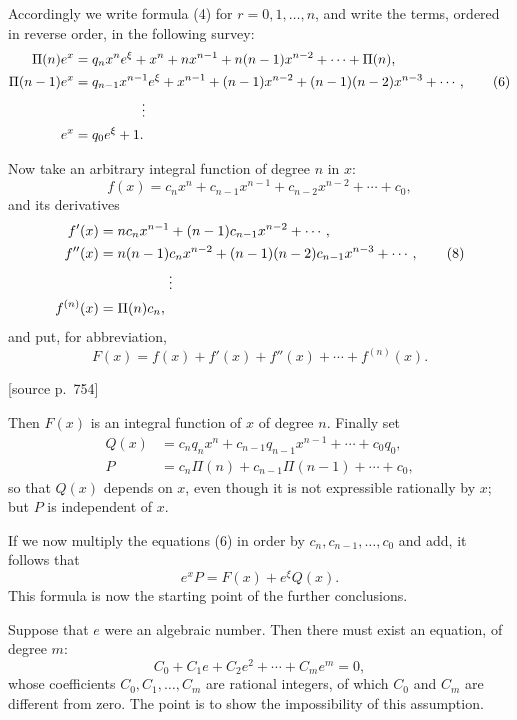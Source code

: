 \documentclass[11pt]{article}
\newcommand{\srcpage}[1]{\par\medskip\noindent\textsf{[source p.~#1]}\par\smallskip}
\begin{document}
Accordingly we write formula (4) for $r=0,1,\ldots,n$, and write the terms, ordered in reverse order, in the following survey:
\begin{align}
\Pi(n)e^x&=q_nx^n e^\xi+x^n+nx^{n-1}+n(n-1)x^{n-2}+\cdots+\Pi(n),\notag\\
\Pi(n-1)e^x&=q_{n-1}x^{n-1}e^\xi+x^{n-1}+(n-1)x^{n-2}
 +(n-1)(n-2)x^{n-3}+\cdots,\tag{6}\\
&\hspace{5em}\vdots\notag\\
e^x&=q_0e^\xi+1.\notag
\end{align}

Now take an arbitrary integral function of degree $n$ in $x$:
\begin{equation}\tag{7}
f(x)=c_nx^n+c_{n-1}x^{n-1}+c_{n-2}x^{n-2}+\cdots+c_0,
\end{equation}
and its derivatives
\begin{align}
f'(x)&=nc_nx^{n-1}+(n-1)c_{n-1}x^{n-2}+\cdots,\\
f''(x)&=n(n-1)c_nx^{n-2}+(n-1)(n-2)c_{n-1}x^{n-3}+\cdots,\tag{8}\\
&\hspace{5em}\vdots\notag\\
f^{(n)}(x)&=\Pi(n)c_n,\notag
\end{align}
and put, for abbreviation,
\begin{equation}\tag{9}
F(x)=f(x)+f'(x)+f''(x)+\cdots+f^{(n)}(x).
\end{equation}

\srcpage{754}
Then $F(x)$ is an integral function of $x$ of degree $n$. Finally set
\begin{align}
Q(x)&=c_nq_nx^n+c_{n-1}q_{n-1}x^{n-1}+\cdots+c_0q_0,\tag{10}\\
P&=c_n\Pi(n)+c_{n-1}\Pi(n-1)+\cdots+c_0,\tag{11}
\end{align}
so that $Q(x)$ depends on $x$, even though it is not expressible rationally by $x$; but $P$ is independent of $x$.

If we now multiply the equations (6) in order by $c_n,c_{n-1},\ldots,c_0$ and add, it follows that
\begin{equation}\tag{12}
e^xP=F(x)+e^\xi Q(x).
\end{equation}
This formula is now the starting point of the further conclusions.

Suppose that $e$ were an algebraic number. Then there must exist an equation, of degree $m$:
\begin{equation}\tag{13}
C_0+C_1e+C_2e^2+\cdots+C_me^m=0,
\end{equation}
whose coefficients $C_0,C_1,\ldots,C_m$ are rational integers, of which $C_0$ and $C_m$ are different from zero. The point is to show the impossibility of this assumption.
\end{document}
